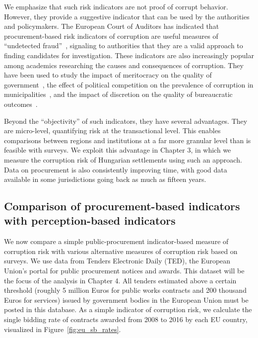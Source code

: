 We emphasize that such risk indicators are not proof of corrupt behavior. However, they provide a suggestive indicator that can be used by the authorities and policymakers. The European Court of Auditors has indicated that procurement-based risk indicators of corruption are useful measures of ``undetected fraud''~\cite{auditors2019fraud}, signaling to authorities that they are a valid approach to finding candidates for investigation. These indicators are also increasingly popular among academics researching the causes and consequences of corruption. They have been used to study the impact of meritocracy on the quality of government~\cite{charron2017careers}, the effect of political competition on the prevalence of corruption in municipalities~\cite{broms2017procurement}, and the impact of discretion on the quality of bureaucratic outcomes~\cite{guerakar2016state}.

Beyond the ``objectivity'' of such indicators, they have several advantages. They are micro-level, quantifying risk at the transactional level. This enables comparisons between regions and institutions at a far more granular level than is feasible with surveys. We exploit this advantage in Chapter 3, in which we measure the corruption risk of Hungarian settlements using such an approach. Data on procurement is also consistently improving time, with good data available in some jurisdictions going back as much as fifteen years.


\subsection{Comparison of procurement-based indicators with perception-based indicators}

We now compare a simple public-procurement indicator-based measure of corruption risk with various alternative measures of corruption risk based on surveys. We use data from Tenders Electronic Daily (TED), the European Union's portal for public procurement notices and awards. This dataset will be the focus of the analysis in Chapter 4. All tenders estimated above a certain threshold (roughly 5 million Euros for public works contracts and 200 thousand Euros for services) issued by government bodies in the European Union must be posted in this database. As a simple indicator of corruption risk, we calculate the single bidding rate of contracts awarded from 2008 to 2016 by each EU country, visualized in Figure~\ref{fig:eu_sb_rates}.

